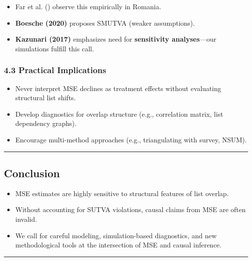 \documentclass[
  12pt,
]{article}
\theoremstyle{plain}
\theoremstyle{definition}
\begin{document}
\begin{itemize}
\item
  Far et al. () observe this
  empirically in Romania.
\item
  \textbf{Boesche (2020)} proposes SMUTVA (weaker assumptions).
\item
  \textbf{Kazunari (2017)} emphasizes need for \textbf{sensitivity
  analyses}---our simulations fulfill this call.
\end{itemize}

\subsubsection{\texorpdfstring{\textbf{4.3 Practical
Implications}}{4.3 Practical Implications}}\label{practical-implications}

\begin{itemize}
\item
  Never interpret MSE declines as treatment effects without evaluating
  structural list shifts.
\item
  Develop diagnostics for overlap structure (e.g., correlation matrix,
  list dependency graphs).
\item
  Encourage multi-method approaches (e.g., triangulating with survey,
  NSUM).
\end{itemize}

\begin{center}\rule{0.5\linewidth}{0.5pt}\end{center}

\subsection{Conclusion}\label{conclusion}

\begin{itemize}
\item
  MSE estimates are highly sensitive to structural features of list
  overlap.
\item
  Without accounting for SUTVA violations, causal claims from MSE are
  often invalid.
\item
  We call for careful modeling, simulation-based diagnostics, and new
  methodological tools at the intersection of MSE and causal inference.
\end{itemize}

\begin{center}\rule{0.5\linewidth}{0.5pt}\end{center}
\end{document}
